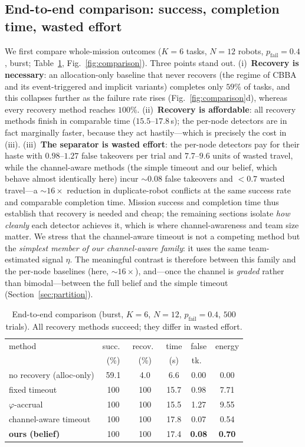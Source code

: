 \documentclass[conference]{IEEEtran}
\begin{document}
\subsection{End-to-end comparison: success, completion time, wasted effort}
\label{sec:e2e}
We first compare whole-mission outcomes ($K{=}6$ tasks, $N{=}12$ robots,
$p_{\text{fail}}{=}0.4$, burst; Table~\ref{tab:e2e}, Fig.~\ref{fig:comparison}).
Three points stand out. (i)~\textbf{Recovery is necessary}: an allocation-only
baseline that never recovers (the regime of CBBA and its event-triggered and
implicit variants) completes only $59\%$ of tasks, and this collapses further as
the failure rate rises (Fig.~\ref{fig:comparison}d), whereas every recovery
method reaches $100\%$. (ii)~\textbf{Recovery is affordable}: all recovery
methods finish in comparable time ($15.5$--$17.8$\,s); the per-node detectors are
in fact marginally faster, because they act hastily---which is precisely the
cost in (iii). (iii)~\textbf{The separator is wasted effort}: the per-node
detectors pay for their haste with $0.98$--$1.27$ false takeovers per trial and
$7.7$--$9.6$ units of wasted travel, while the channel-aware methods (the simple
timeout and our belief, which behave almost identically here) incur $\sim$$0.08$
false takeovers and $<\!0.7$ wasted travel---a $\sim$$16\times$ reduction in
duplicate-robot conflicts at the same success rate and comparable completion
time. Mission success and completion time thus establish that recovery is needed
and cheap; the remaining sections isolate \emph{how cleanly} each detector
achieves it, which is where channel-awareness and team size matter. We stress
that the channel-aware timeout is not a competing method but the \emph{simplest
member of our channel-aware family}: it uses the same team-estimated signal
$\eta$. The meaningful contrast is therefore between this family and the per-node
baselines (here, $\sim$$16\times$), and---once the channel is \emph{graded}
rather than bimodal---between the full belief and the simple timeout
(Section~\ref{sec:partition}).

\begin{table}[t]
\caption{End-to-end comparison (burst, $K{=}6$, $N{=}12$, $p_{\text{fail}}{=}0.4$,
$500$ trials). All recovery methods succeed; they differ in wasted effort.}
\label{tab:e2e}
\centering
\small
\begin{tabular}{lccccc}
\toprule
method & succ.\ & recov.\ & time & false & energy\\
       & (\%)   & (\%)    & (s)  & tk.\  & \\
\midrule
no recovery (alloc-only) & 59.1 & 4.0 & 6.6 & 0.00 & 0.00\\
fixed timeout            & 100  & 100 & 15.7 & 0.98 & 7.71\\
$\varphi$-accrual        & 100  & 100 & 15.5 & 1.27 & 9.55\\
channel-aware timeout    & 100  & 100 & 17.8 & 0.07 & 0.54\\
\textbf{ours (belief)}   & 100  & 100 & 17.4 & \textbf{0.08} & \textbf{0.70}\\
\bottomrule
\end{tabular}
\end{table}
\end{document}

